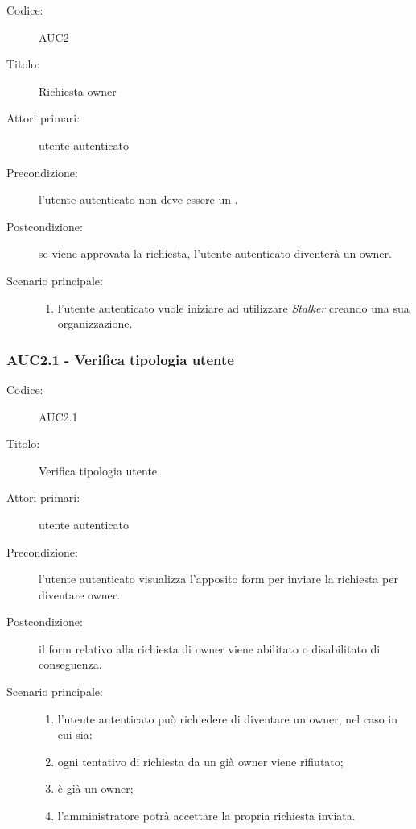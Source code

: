 \documentclass[casi-duso]{subfiles}
\begin{document}
\begin{description}
  \item[Codice:] AUC2
  \item[Titolo:] Richiesta owner
  \item[Attori primari:] utente autenticato
  \item[Precondizione:] l'utente autenticato non deve essere un .
  \item[Postcondizione:] se viene approvata la richiesta, l'utente autenticato diventerà un owner.
  \item[Scenario principale:]
  \begin{enumerate}
    \item l'utente autenticato vuole iniziare ad utilizzare \emph{Stalker} creando una sua organizzazione.
  \end{enumerate}
\end{description}

\subsubsection{AUC2.1 - Verifica tipologia utente}%
\label{subsub:AUC2.1}
\begin{description}
  \item[Codice:] AUC2.1
  \item[Titolo:] Verifica tipologia utente
  \item[Attori primari:] utente autenticato
  \item[Precondizione:] l'utente autenticato visualizza l'apposito form per inviare la richiesta per diventare owner.
  \item[Postcondizione:] il form relativo alla richiesta di owner viene abilitato o disabilitato di conseguenza.
  \item[Scenario principale:]
  \begin{enumerate}
    \item l'utente autenticato può richiedere di diventare un owner, nel caso in cui sia:
    \item ogni tentativo di richiesta da un già owner viene rifiutato;
    \item {} è già un owner;
    \item l'amministratore potrà accettare la propria richiesta inviata.
  \end{enumerate}
\end{description}
\end{document}
